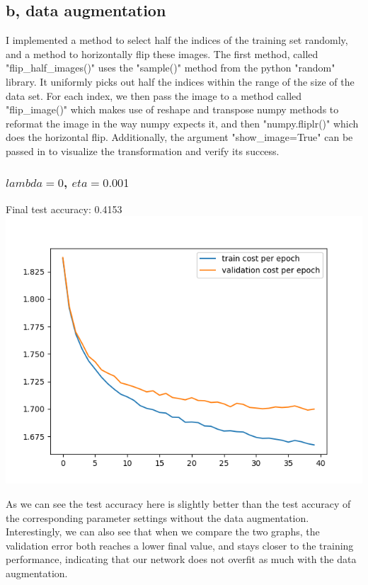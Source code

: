 \documentclass[11pt,a4paper]{article}
\begin{document}
\subsection{b, data augmentation}
I implemented a method to select half the indices of the training set randomly, and a method to horizontally flip these images. The first method, called "flip\_half\_images()" uses the "sample()" method from the python "random" library. It uniformly picks out half the indices within the range of the size of the data set. For each index, we then pass the image to a method called "flip\_image()" which makes use of reshape and transpose numpy methods to reformat the image in the way numpy expects it, and then "numpy.fliplr()" which does the horizontal flip. Additionally, the argument "show\_image=True" can be passed in to visualize the transformation and verify its success.

\subsubsection{$lambda=0$, $eta=0.001$}
Final test accuracy: 0.4153\\
\includegraphics[width=\textwidth]{eta_0.001_lambda_0_augmentation.png}

As we can see the test accuracy here is slightly better than the test accuracy of the corresponding parameter settings without the data augmentation. Interestingly, we can also see that when we compare the two graphs, the validation error both reaches a lower final value, and stays closer to the training performance, indicating that our network does not overfit as much with the data augmentation.
\end{document}
